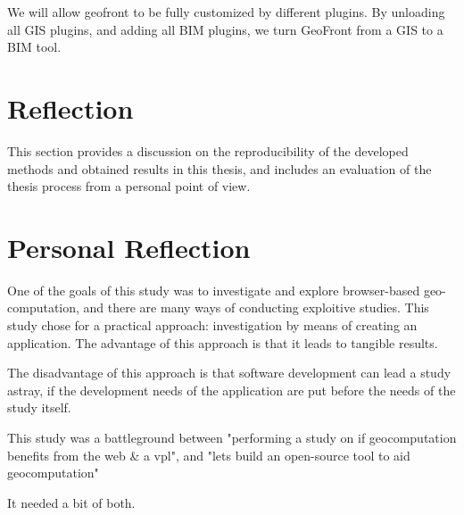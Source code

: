 We will allow geofront to be fully customized by different plugins. By unloading all GIS plugins, and adding all BIM plugins, we turn GeoFront from a GIS to a BIM tool.



\section{Reflection}
\label{sec:reflection}

This section provides a discussion on the reproducibility of the developed methods and obtained results in this thesis, and includes an evaluation of the thesis process from a personal point of view.



\section{Personal Reflection}


One of the goals of this study was to investigate and explore browser-based geo-computation, and there are many ways of conducting exploitive studies. 
This study chose for a practical approach: investigation by means of creating an application.
The advantage of this approach is that it leads to tangible results. 

The disadvantage of this approach is that software development can lead a study astray, if the development needs of the application are put before the needs of the study itself.

This study was a battleground between "performing a study on if geocomputation benefits from the web \& a vpl", and "lets build an open-source tool to aid geocomputation"

It needed a bit of both.




